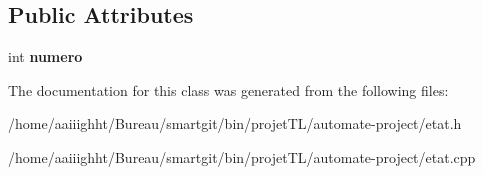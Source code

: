 \subsection*{Public Attributes}
\begin{DoxyCompactItemize}
\item 
\hypertarget{classetat_a155cdfece54b9e8f4a633249ee037595}{int {\bfseries numero}}\label{classetat_a155cdfece54b9e8f4a633249ee037595}

\end{DoxyCompactItemize}


The documentation for this class was generated from the following files\-:\begin{DoxyCompactItemize}
\item 
/home/aaiiighht/\-Bureau/smartgit/bin/projet\-T\-L/automate-\/project/etat.\-h\item 
/home/aaiiighht/\-Bureau/smartgit/bin/projet\-T\-L/automate-\/project/etat.\-cpp\end{DoxyCompactItemize}
